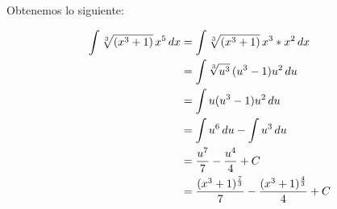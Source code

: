 \documentclass[a4paper,10pt]{article}
\newcommand{\dis}{\displaystyle}
\begin{document}
\begin{enumerate}[label=\emph{\alph*)}]
Obtenemos lo siguiente:

\begin{align*}
 \dis \dis \int \sqrt[3]{(x^3+1)}\, x^5\, dx &= \dis \int \sqrt[3]{(x^3+1)}\, x^3* x^2\, dx \\
      &=  \dis \int \sqrt[3]{u^3}\, (u^3-1) u^2 \, du\\
       &=  \int u(u^3-1) u^2 \, du \\
       &=  \int u^6\, du - \int u^3 \, du\\
       &=  \frac{u^7}{7} - \frac{u^4}{4} + C\\
        &=  \frac{(x^3+1)^{\frac{7}{3}}}{7} - \frac{(x^3+1)^{\frac{4}{3}}}{4} + C
\end{align*}


\end{enumerate}
\end{document}
